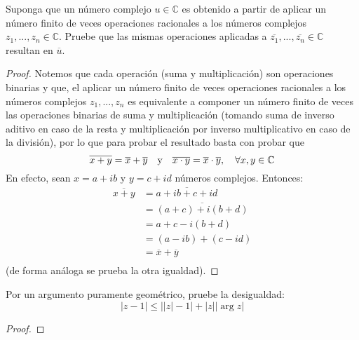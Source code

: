 \documentclass[12pt]{report}
\theoremstyle{largebreak}
\newcommand\abs[1]{\ensuremath{\left|#1\right|}}
\newcommand{\conj}[1]{\ensuremath{\overline{#1}}}
\begin{document}
    \begin{excer}
        Suponga que un número complejo $u\in\mathbb{C}$ es obtenido a partir de aplicar un número finito de veces operaciones racionales a los números complejos $z_1,...,z_n\in\mathbb{C}$. Pruebe que las mismas operaciones aplicadas a $\conj{z_1},...,\conj{z_n}\in\mathbb{C}$ resultan en $\conj{u}$. 
    \end{excer}

    \begin{proof}
        Notemos que cada operación (suma y multiplicación) son operaciones binarias y que, el aplicar un número finito de veces operaciones racionales a los números complejos $z_1,...,z_n$ es equivalente a componer un número finito de veces las operaciones binarias de suma y multiplicación (tomando suma de inverso aditivo en caso de la resta y multiplicación por inverso multiplicativo en caso de la división), por lo que para probar el resultado basta con probar que
        \begin{equation*}
            \conj{x+y}=\conj{x}+\conj{y}\quad\textup{y}\quad\conj{x\cdot y}=\conj{x}\cdot\conj{y},\quad\forall x,y\in\mathbb{C}
        \end{equation*}
        En efecto, sean $x=a+ib$ y $y=c+id$ números complejos. Entonces:
        \begin{equation*}
            \begin{split}
                \conj{x+y}&=\conj{a+ib+c+id}\\
                &=\conj{(a+c)+i(b+d)}\\
                &=a+c-i(b+d)\\
                &=(a-ib)+(c-id)\\
                &=\conj{x}+\conj{y}\\
            \end{split}
        \end{equation*}
        (de forma análoga se prueba la otra igualdad).
    \end{proof}

    \begin{excer}
        Por un argumento puramente geométrico, pruebe la desigualdad:
        \begin{equation*}
            \abs{z-1}\leq\abs{\abs{z}-1}+\abs{z}\abs{\arg z}
        \end{equation*}
    \end{excer}
    
    \begin{proof}
        
    \end{proof}
\end{document}

